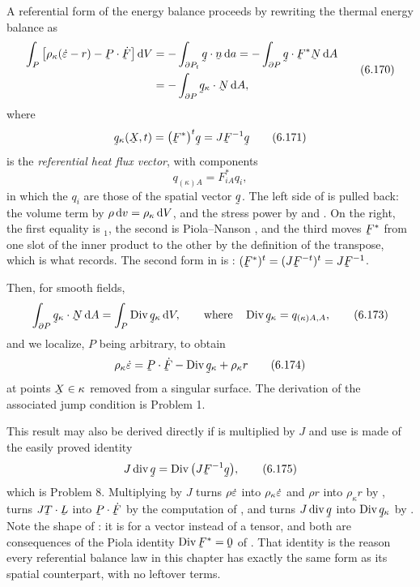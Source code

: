 A referential form of the energy balance proceeds by rewriting the
thermal energy balance as
\begin{equation}
\begin{aligned}
   \int_{P}\big[\rho_{\kappa}(\dot\eps-r)-\bP\cdot\dot\bF\big]\,\dl V
   &=-\int_{\partial P_{t}}\ip\bq\bn\,\dl a
    =-\int_{\partial P}\ip\bq{\bF^{*}\bN}\,\dl A\\
   &=-\int_{\partial P}\ip{\bq_{\kappa}}\bN\,\dl A ,
\end{aligned}
   \tag{6.170}\label{eq:6.170}
\end{equation}
where
\begin{equation}
   \bq_{\kappa}(\bX,t)=\big(\bF^{*}\big)^{t}\bq=J\bF^{-1}\bq
   \tag{6.171}\label{eq:6.171}
\end{equation}
is the \emph{referential heat flux vector}, with components
\begin{equation}
   q_{(\kappa)A}=F^{*}_{iA}q_{i},
   \tag{6.172}\label{eq:6.172}
\end{equation}
in which the $q_{i}$ are those of the spatial vector $\bq$. The left
side of  is  pulled back: the volume term by
$\rho\,\mathrm{d} v=\rho_{\kappa}\,\mathrm{d} V$, and the stress power by
 and . On the right, the first equality is
$_{1}$, the second is Piola--Nanson , and the
third moves $\bF^{*}$ from one slot of the inner product to the other
by the definition of the transpose, which is what  records.
The second form in  is : $(\bF^{*})^{t}
=(J\bF^{-t})^{t}=J\bF^{-1}$.

Then, for smooth fields,
\begin{equation}
   \int_{\partial P}\ip{\bq_{\kappa}}\bN\,\dl A
   =\int_{P}\Dvg\bq_{\kappa}\,\dl V ,
   \qquad\text{where}\quad
   \Dvg\bq_{\kappa}=q_{(\kappa)A,A},
   \tag{6.173}\label{eq:6.173}
\end{equation}
and we localize, $P$ being arbitrary, to obtain
\begin{equation}
   \rho_{\kappa}\dot\eps=\bP\cdot\dot\bF-\Dvg\bq_{\kappa}+\rho_{\kappa}r
   \tag{6.174}\label{eq:6.174}
\end{equation}
at points $\bX\in\kappa$ removed from a singular surface. The
derivation of the associated jump condition is Problem 1.

This result may also be derived directly if  is multiplied
by $J$ and use is made of the easily proved identity
\begin{equation}
   J\dvg\bq=\Dvg\big(J\bF^{-1}\bq\big),
   \tag{6.175}\label{eq:6.175}
\end{equation}
which is Problem 8. Multiplying  by $J$ turns
$\rho\dot{\varepsilon}$ into $\rho_{\kappa}\dot{\varepsilon}$ and $\rho r$ into
$\rho_{\kappa}r$ by , turns $J\bT\cdot\bL$ into
$\bP\cdot\dot\bF$ by the computation of , and turns
$J\dvg\bq$ into $\Dvg\bq_{\kappa}$ by . Note the shape of
: it is  for a vector instead of a tensor, and
both are consequences of the Piola identity $\Dvg\bF^{*}=\bze$ of
. That identity is the reason every referential balance law
in this chapter has exactly the same form as its spatial counterpart,
with no leftover terms.

